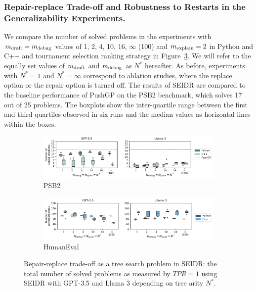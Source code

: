\subsubsection{Repair-replace Trade-off and Robustness to Restarts in the Generalizability Experiments.}
\label{sec:seidr-treearity-ollama}\label{sec:seidr-results-rqllama}

We compare the number of solved problems in the experiments with $m_\text{draft}=m_\text{debug}$ values of 1, 2, 4, 10, 16, $\infty$ (100) and $m_\text{explain}=2$ in Python and C++ and tournament selection ranking strategy in Figure~\ref{fig:repair-replace-trade-off-generalizability}. 
We will refer to the equally set values of $m_\text{draft}$ and $m_\text{debug}$ as $N^*$ hereafter.
As before, experiments with $N^*=1$ and $N^*=\infty$ correspond to ablation studies, where the replace option or the repair option is turned off. 
The results of SEIDR are compared to the baseline performance of PushGP on the PSB2 benchmark, which solves 17 out of 25 problems. 
The boxplots show the inter-quartile range between the first and third quartiles observed in six runs and the median values as horizontal lines within the boxes. 

\begin{figure}
\begin{subfigure}{\linewidth}
\centering
\includegraphics[width=\linewidth, trim={0mm 0mm 0mm 0mm}]{images/num_solved_problem_psb2_6runs_boxplot_v5.pdf}
  \caption{PSB2}
  \label{fig:num-solved-psb2-gpt3.5}
\end{subfigure}
\begin{subfigure}{\columnwidth}
\centering
\includegraphics[width=\linewidth, trim={0mm 0mm 0mm 0mm}]{images/num_solved_problem_humaneval_6runs_boxplot_v5.pdf}
  \caption{HumanEval}
  \label{fig:num-solved-he-gpt3.5}
\end{subfigure}
\caption{Repair-replace trade-off as a tree search problem in SEIDR: the total number of solved problems as measured by $TPR=1$ using SEIDR with GPT-3.5 and Llama 3 depending on tree arity $N^*$.}
\label{fig:repair-replace-trade-off-generalizability}
\end{figure}


